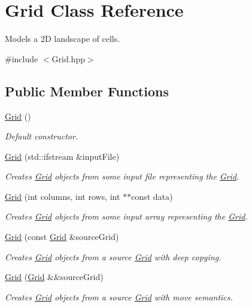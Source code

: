 \hypertarget{class_grid}{}\section{Grid Class Reference}
\label{class_grid}


Models a 2D landscape of cells.  




{\ttfamily \#include $<$Grid.\+hpp$>$}

\subsection*{Public Member Functions}
\begin{DoxyCompactItemize}
\item 
\hyperlink{class_grid_a4ac9ff4f63552b4c61ff90fcb35ad66c}{Grid} ()
\begin{DoxyCompactList}\small\item\em Default constructor. \end{DoxyCompactList}\item 
\hyperlink{class_grid_a88ab1ccc8100827b4da40e62b7b77e96}{Grid} (std\+::ifstream \&input\+File)
\begin{DoxyCompactList}\small\item\em Creates \hyperlink{class_grid}{Grid} objects from some input file representing the \hyperlink{class_grid}{Grid}. \end{DoxyCompactList}\item 
\hyperlink{class_grid_ab64f5607521a89e7a2fb99cbfa5f2b44}{Grid} (int columns, int rows, int $\ast$$\ast$const data)
\begin{DoxyCompactList}\small\item\em Creates \hyperlink{class_grid}{Grid} objects from some input array representing the \hyperlink{class_grid}{Grid}. \end{DoxyCompactList}\item 
\hyperlink{class_grid_a2be5432331273bc420c252ea09631965}{Grid} (const \hyperlink{class_grid}{Grid} \&source\+Grid)
\begin{DoxyCompactList}\small\item\em Creates \hyperlink{class_grid}{Grid} objects from a source \hyperlink{class_grid}{Grid} with deep copying. \end{DoxyCompactList}\item 
\hyperlink{class_grid_a3828d0bf34f6c97ed93adc84d4ce6c4b}{Grid} (\hyperlink{class_grid}{Grid} \&\&source\+Grid)
\begin{DoxyCompactList}\small\item\em Creates \hyperlink{class_grid}{Grid} objects from a source \hyperlink{class_grid}{Grid} with move semantics. \end{DoxyCompactList}\item 
$$
\end{DoxyCompactItemize}
